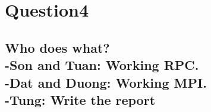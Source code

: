 \documentclass{article}
\begin{document}
\section{Question4}
\subsection{Who does what?\\
-Son and Tuan: Working RPC.\\
-Dat and Duong: Working MPI.\\
-Tung: Write the report}
\end{document}
